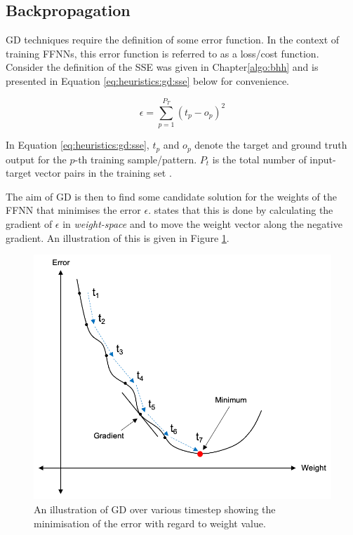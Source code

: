 \subsection{Backpropagation}
\label{sec:heuristics:gd:backpropagation}

\Ac{GD} techniques require the definition of some error function. In the context of training \acp{FFNN}, this error function is referred to as a loss/cost function. Consider the definition of the \ac{SSE} was given in Chapter\ref{algo:bhh} and is presented in Equation \ref{eq:heuristics:gd:sse} below for convenience.

\begin{equation}
    \label{eq:heuristics:gd:sse}
    \epsilon = \sum^{P_{T}}_{p=1}(t_{p} - o_{p})^{2}
\end{equation}

In Equation \ref{eq:heuristics:gd:sse}, $t_{p}$ and $o_{p}$ denote the target and ground truth output for the $p$-th training sample/pattern. $P_{t}$ is the total number of input-target vector pairs in the training set \cite{ref:engelbrecht:2007}.

The aim of \ac{GD} is then to find some candidate solution for the weights of the \ac{FFNN} that minimises the error $\epsilon$. \citeauthor{ref:engelbrecht:2007} \cite{ref:engelbrecht:2007} states that this is done by calculating the gradient of $\epsilon$ in \textit{weight-space} and to move the weight vector along the negative gradient. An illustration of this is given in Figure \ref{fig:heuristics:gd:gd_illustration}.

\begin{figure}[htbp]
    \includegraphics[width=\textwidth]{images/gradient_descent.png}
    \caption{An illustration of \ac{GD} over various timestep showing the minimisation of the error with regard to weight value.}
    \label{fig:heuristics:gd:gd_illustration}
\end{figure}

